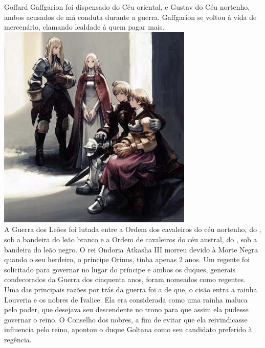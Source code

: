 Goffard Gaffgarion foi dispensado do Céu oriental, e Gustav do Céu nortenho, ambos acusados de má conduta durante a guerra.
Gaffgarion se voltou à vida de mercenário, clamando lealdade à quem pagar mais.
%
\vfill
\includegraphics[width=\columnwidth]{./art/worldbook/belouve.jpg}
%
\clearpage
%
\\
A Guerra dos Leões foi lutada entre a Ordem dos cavaleiros do céu nortenho, do , sob a bandeira do leão branco e a Ordem de cavaleiros do céu austral, do , sob a bandeira do leão negro.
O rei Ondoria Atkasha III morreu devido à Morte Negra quando o seu herdeiro, o príncipe Orinus, tinha apenas 2 anos.
Um regente foi solicitado para governar no lugar do príncipe e ambos os duques, generais condecorados da Guerra dos cinquenta anos, foram nomeados como regentes.
Uma das principais razões por trás da guerra foi a de que, o cisão entra a rainha Louveria e os nobres de Ivalice.
Ela era considerada como uma rainha maluca pelo poder, que desejava seu descendente no trono para que assim ela pudesse governar o reino.
O Conselho dos nobres, a fim de evitar que ela reivindicasse influencia pelo reino, apontou o duque Goltana como seu candidato preferido à regência.
%
\ofpar

